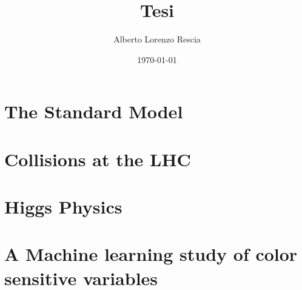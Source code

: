 \documentclass[10pt,a4paper]{book}
\title{Tesi}
\author{Alberto Lorenzo Rescia}
\date{\today}
\begin{document}
\chapter{The Standard Model}


\chapter{Collisions at the LHC}


\chapter{Higgs Physics}


\chapter{A Machine learning study of color sensitive variables}




\end{document}

